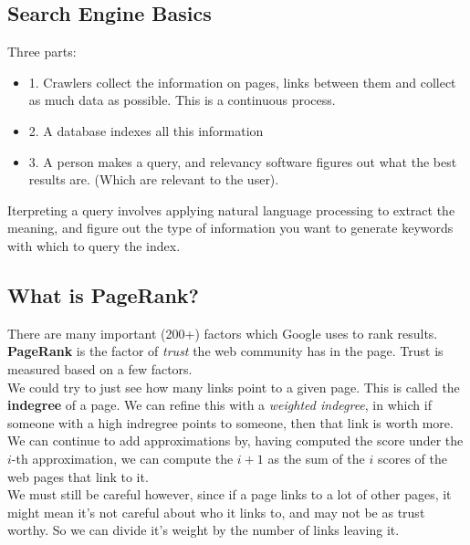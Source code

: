 \documentclass[12pt]{article}
\theoremstyle{definition}
\begin{document}
\subsection{Search Engine Basics}
Three parts:
\begin{itemize}
	\item 1. Crawlers collect the information on pages, links between them and collect as much data as possible. This is a continuous process.
	\item 2. A database indexes all this information
	\item 3. A person makes a query, and relevancy software figures out what the best results are. (Which are relevant to the user).
\end{itemize}
Iterpreting a query involves applying natural language processing to extract the meaning, and figure out the type of information you want to generate keywords with which to query the index.
\\ \linebreak

\subsection{What is PageRank?}
There are many important (200+) factors which Google uses to rank results. \textbf{PageRank} is the factor of \textit{trust} the web community has in the page. Trust is measured based on a few factors. 
\\ \linebreak
We could try to just see how many links point to a given page. This is called the \textbf{indegree} of a page. We can refine this with a \textit{weighted indegree}, in which if someone with a high indregree points to someone, then that link is worth more. 
\\ \linebreak
We can continue to add approximations by, having computed the score under the $i$-th approximation, we can compute the $i+1$ as the sum of the $i$ scores of the web pages that link to it. 
\\ \linebreak
We must still be careful however, since if a page links to a lot of other pages, it might mean it's not careful about who it links to, and may not be as trust worthy. So we can divide it's weight by the number of links leaving it. 
\\ \linebreak
\end{document}
